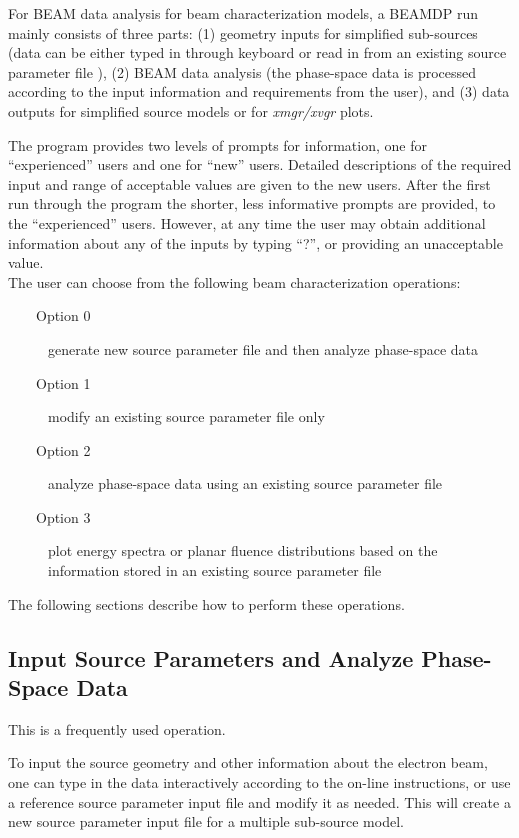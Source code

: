 \documentclass[12pt,twoside]{article}
\begin{document}
For BEAM data analysis for beam characterization models,  a BEAMDP run mainly consists of three parts: (1) geometry inputs for simplified sub-sources (data can be either typed in through keyboard or read in from an existing source parameter file ), (2) BEAM data analysis (the phase-space data is processed according to the input information and requirements from the user), and (3) data outputs for simplified source models or for {\it xmgr/xvgr} plots.

The program provides two levels of prompts for information, one for ``experienced'' users and one for ``new'' users. Detailed descriptions of the required input and range of acceptable values are given to the new users. After the first run through the program the shorter, less informative prompts are provided, to the ``experienced'' users. However, at any time the user may obtain additional information about any of the inputs by typing ``?'', or providing an unacceptable value.\\

The user can choose from the following beam characterization operations:

\begin{description}
\item [~~~~Option 0] generate new source parameter file and then analyze phase-space data
\item [~~~~Option 1] modify an existing source parameter file only
\item [~~~~Option 2] analyze phase-space data using an existing source parameter file
\item [~~~~Option 3] plot energy spectra or planar fluence distributions based on the information stored in an existing source parameter file

\end{description}

The following sections describe how to perform these operations.

\subsection{Input Source Parameters and Analyze Phase-Space Data}
This is a frequently used operation.

To input the source geometry and other information about the electron beam, one can type in the data interactively according to the on-line instructions, or use a reference source parameter input file and modify it as needed. This will create a new source parameter input file for a multiple sub-source model.
\end{document}

